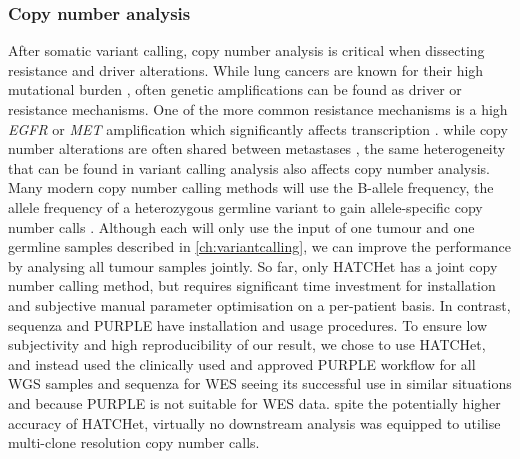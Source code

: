 \subsubsection{Copy number analysis}
\label{cascade-sec:cnv}
After somatic variant calling, copy number analysis is critical when dissecting  resistance and driver alterations. While lung cancers are known for their high mutational burden \cite{Alexandrov2020}, often genetic amplifications can be found as driver or resistance mechanisms. One of the more common resistance mechanisms is a high \textit{EGFR} or \textit{MET} amplification which significantly affects transcription \cite{Bjaanaes2021}.  while copy number alterations are often shared between metastases \cite{Ni2013}, the same heterogeneity that can be found in variant calling analysis also affects copy number analysis. Many modern copy number calling methods will use the B-allele frequency, the allele frequency of a heterozygous germline variant to gain allele-specific copy number calls \cite{Favero2015,Talevich2016,Cameron2019a}. Although each  will only use the input of one tumour and one germline samples described in \autoref{ch:variantcalling}, we can  improve the performance by analysing all tumour samples jointly. So far, only HATCHet \cite{Zaccaria2020} has a joint copy number calling method, but  requires significant time investment for installation and subjective manual parameter optimisation on a per-patient basis. In contrast,  sequenza and PURPLE have  installation and usage procedures. To ensure low subjectivity and high reproducibility of our result, we chose  to  use HATCHet, and instead used the clinically used and approved PURPLE workflow for all WGS samples and sequenza for WES seeing its successful use in similar situations \cite{Leong2018,Vergara2021} and because PURPLE is not suitable for WES data. spite  the potentially higher accuracy of HATCHet, virtually no downstream analysis was equipped to utilise multi-clone resolution copy number calls.

